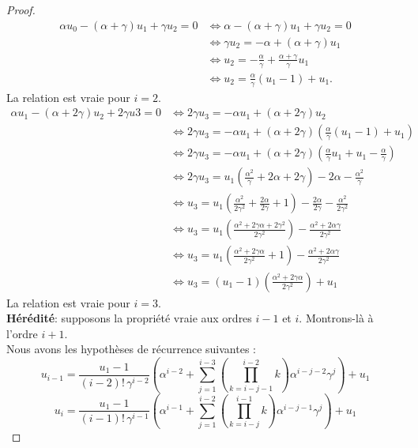 \documentclass[12pt,a4paper]{report}
\theoremstyle{remark}
\begin{document}
\begin{proof}
\begin{align*}
\alpha u_0 - (\alpha + \gamma) u_1 + \gamma u_2 = 0 &\iff \alpha - (\alpha + \gamma) u_1 + \gamma u_2 = 0 \\
&\iff \gamma u_2 = - \alpha + (\alpha + \gamma)u_1 \\
&\iff u_2 = - \frac{\alpha}{\gamma} + \frac{\alpha + \gamma}{\gamma} u_1 \\
&\iff u_2 = \frac{\alpha}{\gamma}(u_1 - 1) + u_1.
\end{align*}
La relation est vraie pour $i=2$.
\begin{align*}
\alpha u_1 - (\alpha + 2\gamma) u_2+2\gamma u3 = 0 &\iff 2 \gamma u_3 = -\alpha u_1+ (\alpha + 2\gamma) u_2 \\
& \iff 2 \gamma u_3 = -\alpha u_1 + (\alpha + 2\gamma) \left(\frac{\alpha}{\gamma}(u_1 - 1) + u_1 \right)\\
&\iff 2 \gamma u_3 = -\alpha u_1 + (\alpha + 2\gamma) \left(\frac{\alpha}{\gamma}u_1 +u_1 - \frac{\alpha}{\gamma} \right) \\
&\iff 2 \gamma u_3 = u_1\left(\frac{\alpha^2}{\gamma} +2\alpha  +2\gamma\right) - 2\alpha - \frac{\alpha^2}{\gamma} \\
&\iff  u_3 = u_1\left(\frac{\alpha^2}{2\gamma^2} +\frac{2\alpha}{2\gamma}  +1\right) - \frac{2\alpha}{2\gamma} - \frac{\alpha^2}{2\gamma^2}\\
&\iff u_3 = u_1\left(\frac{\alpha^2+2\gamma\alpha + 2\gamma^2}{2\gamma^2}\right)- \frac{\alpha^2+ 2\alpha\gamma}{2\gamma^2} \\
&\iff u_3 = u_1\left(\frac{\alpha^2+2\gamma\alpha}{2\gamma^2} + 1 \right)- \frac{\alpha^2+ 2\alpha\gamma}{2\gamma^2} \\
&\iff u_3 = (u_1 - 1) \left(\frac{\alpha^2+2\gamma\alpha}{2\gamma^2}\right) + u_1
\end{align*}
La relation est vraie pour $i=3$.\\

\textbf{Hérédité}: supposons la propriété vraie aux ordres $i-1$ et $i$. Montrons-là à l'ordre $i+1$.\\

Nous avons les hypothèses de récurrence suivantes : 
$$u_{i-1} = \frac{u_1 - 1}{(i-2)! \, \gamma^{i-2}} \left( \alpha^{i-2} + \sum_{j=1}^{i-3}(\prod_{k=i-j-1}^{i-2} k) \alpha^{i-j-2} \gamma^j \right) + u_1 $$
$$u_i = \frac{u_1 - 1}{(i-1)! \, \gamma^{i-1}} \left( \alpha^{i-1} + \sum_{j=1}^{i-2}(\prod_{k=i-j}^{i-1} k) \alpha^{i-j-1} \gamma^j \right) + u_1 $$


\end{proof}
\end{document}
